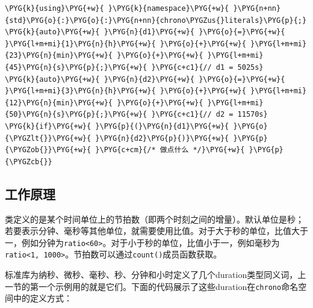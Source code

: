 \begin{itemize}
\begin{codeblockbg}
\begin{Verbatim}[commandchars=\\\{\},breaklines=true,breakanywhere=true,fontsize=\codefont,xleftmargin=17bp]
\PYG{k}{using}\PYG{+w}{ }\PYG{k}{namespace}\PYG{+w}{ }\PYG{n+nn}{std}\PYG{o}{:}\PYG{o}{:}\PYG{n+nn}{chrono\PYGZus{}literals}\PYG{p}{;}
\PYG{k}{auto}\PYG{+w}{ }\PYG{n}{d1}\PYG{+w}{ }\PYG{o}{=}\PYG{+w}{ }\PYG{l+m+mi}{1}\PYG{n}{h}\PYG{+w}{ }\PYG{o}{+}\PYG{+w}{ }\PYG{l+m+mi}{23}\PYG{n}{min}\PYG{+w}{ }\PYG{o}{+}\PYG{+w}{ }\PYG{l+m+mi}{45}\PYG{n}{s}\PYG{p}{;}\PYG{+w}{ }\PYG{c+c1}{// d1 = 5025s}
\PYG{k}{auto}\PYG{+w}{ }\PYG{n}{d2}\PYG{+w}{ }\PYG{o}{=}\PYG{+w}{ }\PYG{l+m+mi}{3}\PYG{n}{h}\PYG{+w}{ }\PYG{o}{+}\PYG{+w}{ }\PYG{l+m+mi}{12}\PYG{n}{min}\PYG{+w}{ }\PYG{o}{+}\PYG{+w}{ }\PYG{l+m+mi}{50}\PYG{n}{s}\PYG{p}{;}\PYG{+w}{ }\PYG{c+c1}{// d2 = 11570s}
\PYG{k}{if}\PYG{+w}{ }\PYG{p}{(}\PYG{n}{d1}\PYG{+w}{ }\PYG{o}{\PYGZlt{}}\PYG{+w}{ }\PYG{n}{d2}\PYG{p}{)}\PYG{+w}{ }\PYG{p}{\PYGZob{}}\PYG{+w}{ }\PYG{c+cm}{/* 做点什么 */}\PYG{+w}{ }\PYG{p}{\PYGZcb{}}
\end{Verbatim}
\end{codeblockbg}

\end{itemize}



\subsection{工作原理}



类定义的是某个时间单位上的节拍数（即两个时刻之间的增量）。默认单位是秒；若要表示分钟、毫秒等其他单位，就需要使用比值。对于大于秒的单位，比值大于一，例如分钟为\texttt{ratio<\allowbreak{}60>}。对于小于秒的单位，比值小于一，例如毫秒为\texttt{ratio<\allowbreak{}1, 1000>}。节拍数可以通过\texttt{count()}成员函数获取。



标准库为纳秒、微秒、毫秒、秒、分钟和小时定义了几个duration类型同义词，上一节的第一个示例用的就是它们。下面的代码展示了这些duration在\texttt{chrono}命名空间中的定义方式：



